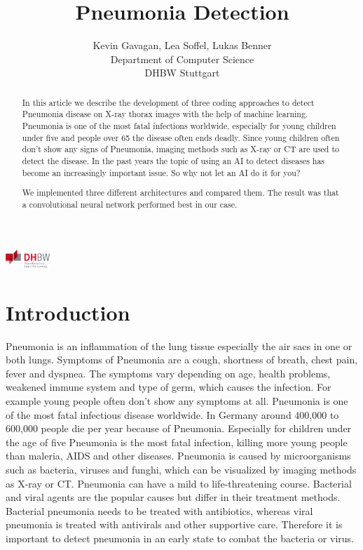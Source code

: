 \documentclass{article}
\title{Pneumonia Detection}
\author{
  Kevin Gavagan, Lea Soffel, Lukas Benner\\
  Department of Computer Science\\
  DHBW Stuttgart\\
}
\begin{document}
\begin{center}
\includegraphics[height=0.7cm]{images/dhbw_logo.png}
\end{center}

\maketitle

\begin{abstract}
In this article we describe the development of three coding approaches to detect Pneumonia disease on X-ray thorax images with the help of machine learning. 
Pneumonia is one of the most fatal infections worldwide, 
especially for young children under five and people over 65 the disease often ends deadly. 
Since young children often don't show any signs of Pneumonia, imaging methods such as X-ray or CT are used to detect the disease. 
In the past years the topic of using an AI to detect diseases has become an increasingly important issue. 
So why not let an AI do it for you?

We implemented three different architectures and compared them. 
The result was that a convolutional neural network performed best in our case.
\end{abstract}

\section{Introduction}	

Pneumonia is an inflammation of the lung tissue especially the air sacs in one or both lungs. 
Symptoms of Pneumonia are a cough, shortness of breath, chest pain, fever and dyspnea. 
The symptoms vary depending on age, health problems, weakened immune system and type of germ, 
which causes the infection. For example young people often don't show any symptoms at all. 
Pneumonia is one of the most fatal infectious disease worldwide. 
In Germany around 400,000 to 600,000 people die per year because of Pneumonia. 
Especially for children under the age of five Pneumonia is the most fatal infection, 
killing more young people than maleria, AIDS and other diseases. 
Pneumonia is caused by microorganisms such as bacteria, viruses and funghi, 
which can be visualized by imaging methods as X-ray or CT. 
Pneumonia can have a mild to life-threatening course. 
Bacterial and viral agents are the popular causes but differ in their treatment methods. 
Bacterial pneumonia needs to be treated with antibiotics, 
whereas viral pneumonia is treated with antivirals and other supportive care. 
Therefore it is important to detect pneumonia in an early state to combat the bacteria or virus. 
\end{document}
